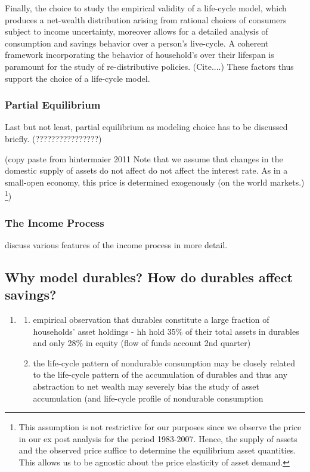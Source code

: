 \documentclass[a4paper,12pt]{article}
\begin{document}
Finally, the choice to study the empirical validity of a life-cycle model, which produces a net-wealth distribution arising from rational choices of consumers subject to income uncertainty, moreover allows for a detailed analysis of consumption and savings behavior over a person's live-cycle. A coherent framework incorporating the behavior of household's over their lifespan is paramount for the study of re-distributive policies. (Cite....)
These factors thus support the choice of a life-cycle model. 


\subsubsection{Partial Equilibrium}
Last but not least, partial equilibrium as modeling choice has to be discussed briefly. (????????????????)

(copy paste from hintermaier 2011
Note that we assume that changes in the domestic supply of assets do not affect do not affect the interest rate. As in a small-open economy, this price is determined exogenously (on the world markets.) \footnote{This assumption is not restrictive for our purposes since we observe the price in our ex post analysis for the period 1983-2007. Hence, the supply of assets and the observed price suffice to determine the equilibrium asset quantities. This allows us to be agnostic about the price elasticity of asset demand.})

\subsubsection{The Income Process}
\cite{kaplan2010} discuss various features of the income process in more detail.

\subsection{Why model durables? How do durables affect savings?}
\begin{enumerate}
\item \cite{FV&K2011} 
\begin{enumerate}
\item empirical observation that durables constitute a large fraction of households' asset holdings - hh hold 35\% of their total assets in durables and only 28\% in equity (flow of funds account 2nd quarter) 
\item the life-cycle pattern of nondurable consumption may be closely related to the life-cycle pattern of the accumulation of durables and thus any abstraction to net wealth may severely bias the study of asset accumulation (and life-cycle profile of nondurable consumption
\end{enumerate}
\end{enumerate}
\end{document}

